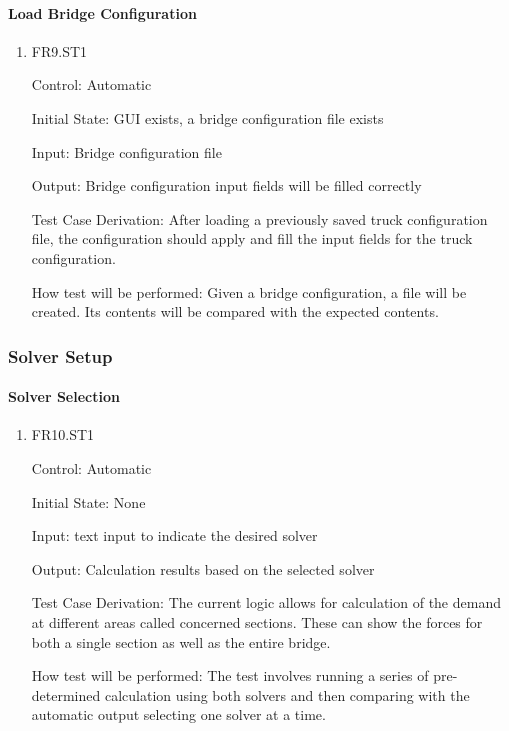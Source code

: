 \documentclass[12pt, titlepage]{article}
\begin{document}
\paragraph{Load Bridge Configuration}

\begin{enumerate}
  
  \item{FR9.ST1\\}
  
  Control: Automatic
  
  Initial State: GUI exists, a bridge configuration file exists
  
  Input: Bridge configuration file
  
  Output: Bridge configuration input fields will be filled correctly
  
  Test Case Derivation: After loading a previously saved truck configuration file, the configuration
  should apply and fill the input fields for the truck configuration.
  
  How test will be performed: Given a bridge configuration, a file will be created. Its contents
  will be compared with the expected contents.

\end{enumerate}

\subsubsection{Solver Setup}

\paragraph{Solver Selection}

\begin{enumerate}

  \item{FR10.ST1\\}

  Control: Automatic
            
  Initial State: None
            
  Input: text input to indicate the desired solver 
            
  Output: Calculation results based on the selected solver

  Test Case Derivation: The current logic allows for calculation of the demand at different areas called concerned sections. These can show the forces for both a single section as well as the entire bridge. 

  How test will be performed: The test involves running a series of pre-determined calculation using both solvers and then comparing with the automatic output selecting one solver at a time. 
					
\end{enumerate}
\end{document}

